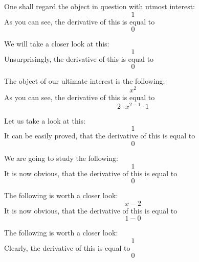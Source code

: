 \documentclass{article}
\begin{document}
One shall regard the object in question with utmost interest:
\begin{equation}
1 
\end{equation}
As you can see, the derivative of this is equal to
\begin{equation}
0 
\end{equation}

We will take a closer look at this:
\begin{equation}
1 
\end{equation}
Unsurprisingly, the derivative of this is equal to
\begin{equation}
0 
\end{equation}

The object of our ultimate interest is the following:
\begin{equation}
x ^{2 } 
\end{equation}
As you can see, the derivative of this is equal to
\begin{equation}
2 \cdot x ^{2 - 1 } \cdot 1 
\end{equation}

Let us take a look at this:
\begin{equation}
1 
\end{equation}
It can be easily proved, that the derivative of this is equal to
\begin{equation}
0 
\end{equation}

We are going to study the following:
\begin{equation}
1 
\end{equation}
It is now obvious, that the derivative of this is equal to
\begin{equation}
0 
\end{equation}

The following is worth a closer look:
\begin{equation}
x - 2 
\end{equation}
It is now obvious, that the derivative of this is equal to
\begin{equation}
1 - 0 
\end{equation}

The following is worth a closer look:
\begin{equation}
1 
\end{equation}
Clearly, the derivative of this is equal to
\begin{equation}
0 
\end{equation}
\end{document}
